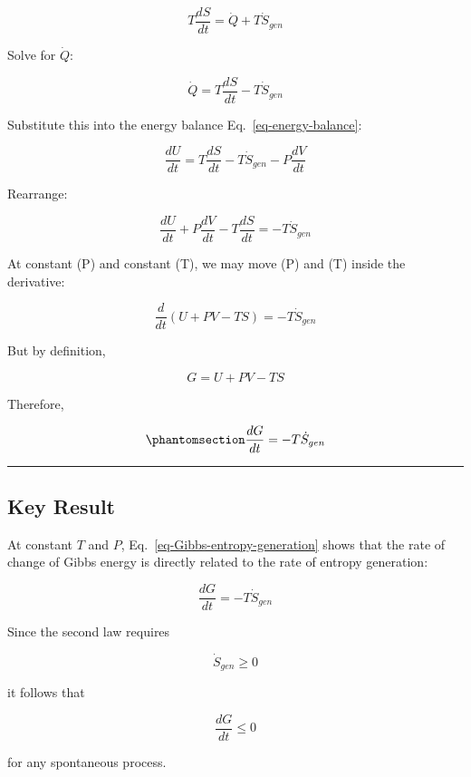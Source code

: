 \documentclass[
  letterpaper,
  DIV=11,
  numbers=noendperiod]{scrartcl}
\begin{document}
\[
T\frac{dS}{dt} = \dot{Q} + T\dot{S}_{gen}
\]

Solve for \(\dot{Q}\):

\[
\dot{Q} = T\frac{dS}{dt} - T\dot{S}_{gen}
\]

Substitute this into the energy balance Eq.~\ref{eq-energy-balance}:

\[
\frac{dU}{dt} = T\frac{dS}{dt} - T\dot{S}_{gen} - P\frac{dV}{dt}
\]

Rearrange:

\[
\frac{dU}{dt} + P\frac{dV}{dt} - T\frac{dS}{dt} = -T\dot{S}_{gen}
\]

At constant (P) and constant (T), we may move (P) and (T) inside the
derivative:

\[
\frac{d}{dt}(U+PV-TS) = -T\dot{S}_{gen}
\]

But by definition,

\[
G = U + PV - TS
\]

Therefore,

\begin{equation}\phantomsection\label{eq-Gibbs-entropy-generation}{
\frac{dG}{dt} = -T\dot{S}_{gen}
}\end{equation}

\begin{center}\rule{0.5\linewidth}{0.5pt}\end{center}

\subsection{Key Result}\label{key-result}

\begin{tcolorbox}[enhanced jigsaw, opacitybacktitle=0.6, leftrule=.75mm, left=2mm, toprule=.15mm, toptitle=1mm, colback=white, colbacktitle=quarto-callout-important-color!10!white, bottomrule=.15mm, rightrule=.15mm, colframe=quarto-callout-important-color-frame, arc=.35mm, coltitle=black, breakable, bottomtitle=1mm, titlerule=0mm, title=\textcolor{quarto-callout-important-color}{\faExclamation}\hspace{0.5em}{Key Result: Gibbs Energy and Entropy Generation}, opacityback=0]

At constant \(T\) and \(P\), Eq.~\ref{eq-Gibbs-entropy-generation} shows
that the rate of change of Gibbs energy is directly related to the rate
of entropy generation:

\[
\frac{dG}{dt} = -T\dot{S}_{gen}
\]

Since the second law requires

\[
\dot{S}_{gen} \ge 0
\]

it follows that

\[
\frac{dG}{dt} \le 0
\]

for any spontaneous process.

\end{tcolorbox}
\end{document}
